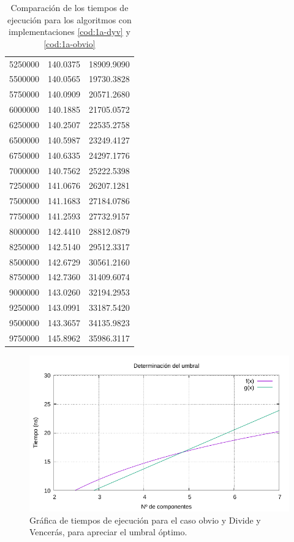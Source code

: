 \begin{table}
\begin{tabular}{|r|r|r|}
		5250000 & 140.0375 & 18909.9090 \\ 
		5500000 & 140.0565 & 19730.3828 \\ 
		5750000 & 140.0909 & 20571.2680 \\ 
		6000000 & 140.1885 & 21705.0572 \\ 
		6250000 & 140.2507 & 22535.2758 \\ 
		6500000 & 140.5987 & 23249.4127 \\ 
		6750000 & 140.6335 & 24297.1776 \\ 
		7000000 & 140.7562 & 25222.5398 \\ 
		7250000 & 141.0676 & 26207.1281 \\ 
		7500000 & 141.1683 & 27184.0786 \\ 
		7750000 & 141.2593 & 27732.9157 \\ 
		8000000 & 142.4410 & 28812.0879 \\ 
		8250000 & 142.5140 & 29512.3317 \\ 
		8500000 & 142.6729 & 30561.2160 \\ 
		8750000 & 142.7360 & 31409.6074 \\ 
		9000000 & 143.0260 & 32194.2953 \\ 
		9250000 & 143.0991 & 33187.5420 \\ 
		9500000 & 143.3657 & 34135.9823 \\ 
		9750000 & 145.8962 & 35986.3117 \\ 
		\hline
	\end{tabular}

	\caption{Comparación de los tiempos de ejecución para los algoritmos con implementaciones \ref{cod:1a-dyv} y \ref{cod:1a-obvio}}
	\label{tab:1a-com}
\end{table}

\begin{figure}
	\centering
	\includegraphics[scale=0.76]{img/e1a-umbral.pdf}
	\caption{Gráfica de tiempos de ejecución para el caso obvio y Divide y Vencerás, para apreciar el umbral
	óptimo.}
	\label{fig:1a-com-graph}
\end{figure}

